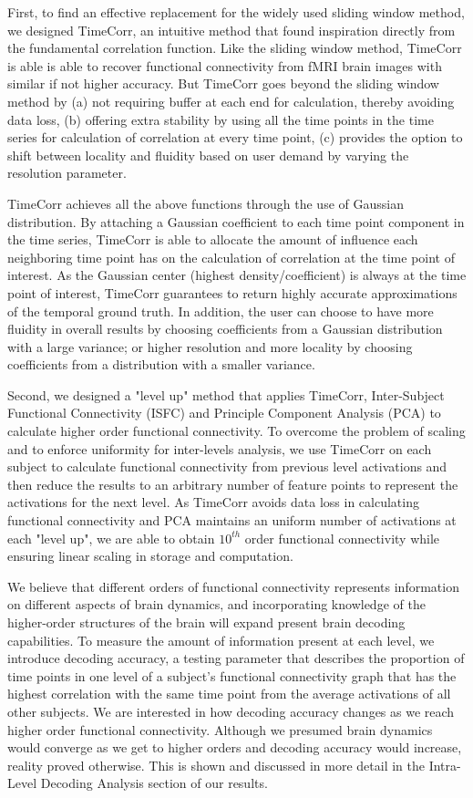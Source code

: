 \documentclass[11pt]{article}
\begin{document}
First, to find an effective replacement for the widely used sliding window method, we designed TimeCorr, an intuitive method that found inspiration directly from the fundamental correlation function. Like the sliding window method, TimeCorr is able is able to recover functional connectivity from fMRI brain images with similar if not higher accuracy. But TimeCorr goes beyond the sliding window method by (a) not requiring buffer at each end for calculation, thereby avoiding data loss, (b) offering extra stability by using all the time points in the time series for calculation of correlation at every time point, (c) provides the option to shift between locality and fluidity based on user demand by varying the resolution parameter.

TimeCorr achieves all the above functions through the use of Gaussian distribution. By attaching a Gaussian coefficient to each time point component in the time series, TimeCorr is able to allocate the amount of influence each neighboring time point has on the calculation of correlation at the time point of interest. As the Gaussian center (highest density/coefficient) is always at the time point of interest, TimeCorr guarantees to return highly accurate approximations of the temporal ground truth. In addition, the user can choose to have more fluidity in overall results by choosing coefficients from a Gaussian distribution with a large variance; or higher resolution and more locality by choosing coefficients from a distribution with a smaller variance.

Second, we designed a "level up" method that applies TimeCorr, Inter-Subject Functional Connectivity (ISFC) and Principle Component Analysis (PCA) to calculate higher order functional connectivity. To overcome the problem of scaling and to enforce uniformity for inter-levels analysis, we use TimeCorr on each subject to calculate functional connectivity from previous level activations and then reduce the results to an arbitrary number of feature points to represent the activations for the next level. As TimeCorr avoids data loss in calculating functional connectivity and PCA maintains an uniform number of activations at each "level up", we are able to obtain $10^{th}$ order functional connectivity while ensuring linear scaling in storage and computation.

We believe that different orders of functional connectivity represents information on different aspects of brain dynamics, and incorporating knowledge of the higher-order structures of the brain will expand present brain decoding capabilities. To measure the amount of information present at each level, we introduce decoding accuracy, a testing parameter that describes the proportion of time points in one level of a subject's functional connectivity graph that has the highest correlation with the same time point from the average activations of all other subjects. We are interested in how decoding accuracy changes as we reach higher order functional connectivity. Although we presumed brain dynamics would converge as we get to higher orders and decoding accuracy would increase, reality proved otherwise. This is shown and discussed in more detail in the Intra-Level Decoding Analysis section of our results.
\end{document}
